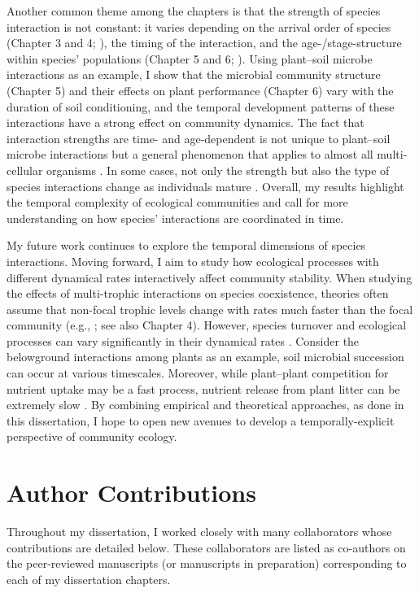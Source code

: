 Another common theme among the chapters is that the strength of species interaction is not constant: it varies depending on the arrival order of species (Chapter 3 and 4; \citealp{Fukami2015, Duhamel2019}), the timing of the interaction, and the age-/stage-structure within species' populations (Chapter 5 and 6; \citealp{Kardol2013Oikos, Peay2018}). Using plant--soil microbe interactions as an example, I show that the microbial community structure (Chapter 5) and their effects on plant performance (Chapter 6) vary with the duration of soil conditioning, and the temporal development patterns of these interactions have a strong effect on community dynamics. The fact that interaction strengths are time- and age-dependent is not unique to plant--soil microbe interactions but a general phenomenon that applies to almost all multi-cellular organisms \citep{Miller2011, deRoos2013, Nakazawa2015}. In some cases, not only the strength but also the type of species interactions change as individuals mature \citep{Yang2010, KeNakazawa2018}. Overall, my results highlight the temporal complexity of ecological communities and call for more understanding on how species' interactions are coordinated in time.
\par


My future work continues to explore the temporal dimensions of species interactions. Moving forward, I aim to study how ecological processes with different dynamical rates interactively affect community stability. When studying the effects of multi-trophic interactions on species coexistence, theories often assume that non-focal trophic levels change with rates much faster than the focal community (e.g., \citealp{Chesson2008}; see also Chapter 4). However, species turnover and ecological processes can vary significantly in their dynamical rates \citep{Rinaldi2000, Menge2012, LiChesson2016}. Consider the belowground interactions among plants as an example, soil microbial succession can occur at various timescales. Moreover, while plant--plant competition for nutrient uptake may be a fast process, nutrient release from plant litter can be extremely slow \citep{Menge2008}. By combining empirical and theoretical approaches, as done in this dissertation, I hope to open new avenues to develop a temporally-explicit perspective of community ecology.
\par



\section{Author Contributions}
Throughout my dissertation, I worked closely with many collaborators whose contributions are detailed below. These collaborators are listed as co-authors on the peer-reviewed manuscripts (or manuscripts in preparation) corresponding to each of my dissertation chapters.
\par


